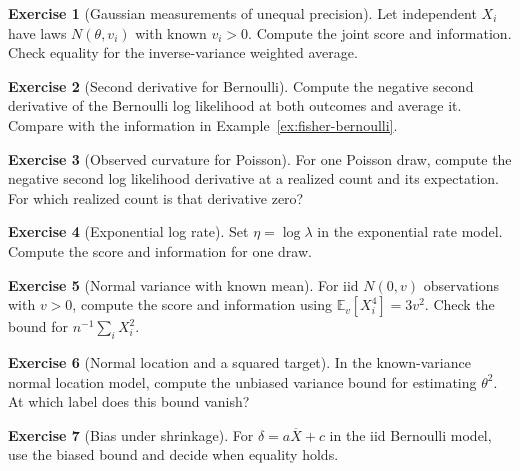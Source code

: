\documentclass[11pt,oneside]{book}
\theoremstyle{definition}
\newtheorem{exercise}{Exercise}[section]
\theoremstyle{remark}
\begin{document}
\begin{exercise}[Gaussian measurements of unequal precision]
\label{exer:fisher-gaussian-unequal-precision}
Let independent $X_i$ have laws $N(\theta,v_i)$ with known
$v_i>0$. Compute the joint score and information.
Check equality for the inverse-variance weighted average.
\end{exercise}

\begin{exercise}[Second derivative for Bernoulli]
\label{exer:fisher-bernoulli-expected-curvature}
Compute the negative second derivative of the Bernoulli log
likelihood at both outcomes and average it. Compare with the
information in Example~\ref{ex:fisher-bernoulli}.
\end{exercise}

\begin{exercise}[Observed curvature for Poisson]
\label{exer:fisher-poisson-observed-curvature}
For one Poisson draw, compute the negative second log
likelihood derivative at a realized count and its expectation.
For which realized count is that derivative zero?
\end{exercise}

\begin{exercise}[Exponential log rate]
\label{exer:fisher-exponential-log-rate}
Set $\eta=\log\lambda$ in the exponential rate model.
Compute the score and information for one draw.
\end{exercise}

\begin{exercise}[Normal variance with known mean]
\label{exer:fisher-normal-variance-known-mean}
For iid $N(0,v)$ observations with $v>0$, compute the score
and information using $\mathbb E_v[X_i^4]=3v^2$.
Check the bound for $n^{-1}\sum_iX_i^2$.
\end{exercise}

\begin{exercise}[Normal location and a squared target]
\label{exer:fisher-normal-squared-target}
In the known-variance normal location model, compute the
unbiased variance bound for estimating $\theta^2$. At which
label does this bound vanish?
\end{exercise}

\begin{exercise}[Bias under shrinkage]
\label{exer:fisher-bernoulli-affine-bias}
For $\delta=a\overline X+c$ in the iid Bernoulli model,
use the biased bound and decide when equality holds.
\end{exercise}
\end{document}
